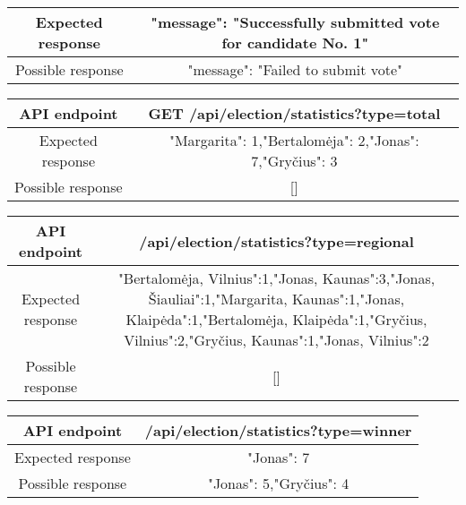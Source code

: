 \documentclass[12pt,a4paper]{article}
\begin{document}
\begin{center}
\begin{tabular}{ |c|c| }
 \hline
 Expected response & {"message": "Successfully submitted vote for candidate No. 1"} \\ \hline
 Possible response & {"message": "Failed to submit vote"} \\ \hline
\end{tabular}
\end{center}

\begin{center}
\begin{tabular}{ |c|c| }
 \hline
 API endpoint & GET /api/election/statistics?type=total \\ \hline
 Expected response & {"Margarita": 1,"Bertalomėja": 2,"Jonas": 7,"Gryčius": 3} \\ \hline
 Possible response & [] \\ \hline
\end{tabular}
\end{center}

\begin{center}
\begin{tabular}{ |c|c| }
 \hline
 API endpoint & /api/election/statistics?type=regional \\ \hline
 Expected response & {"Bertalomėja, Vilnius":1,"Jonas, Kaunas":3,"Jonas, Šiauliai":1,"Margarita, Kaunas":1,"Jonas, Klaipėda":1,"Bertalomėja, Klaipėda":1,"Gryčius, Vilnius":2,"Gryčius, Kaunas":1,"Jonas, Vilnius":2} \\ \hline
 Possible response & [] \\ \hline
\end{tabular}
\end{center}

\begin{center}
\begin{tabular}{ |c|c| }
 \hline
 API endpoint & /api/election/statistics?type=winner \\ \hline
 Expected response & {"Jonas": 7} \\ \hline
 Possible response & {"Jonas": 5,"Gryčius": 4} \\ \hline
\end{tabular}
\end{center}
\end{document}
